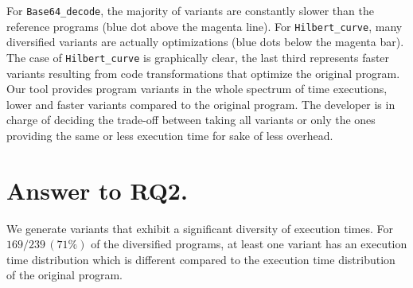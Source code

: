 For \texttt{Base64\_decode}, the majority of variants are constantly slower than the reference programs (blue dot above the magenta line). For \texttt{Hilbert\_curve}, many diversified variants are actually optimizations (blue dots below the magenta bar). The case of \texttt{Hilbert\_curve} is graphically clear, the last third represents faster variants resulting from code transformations that optimize the original program.
Our tool provides program variants in the whole spectrum of time executions, lower and faster variants compared to the original program. The developer is in charge of deciding the trade-off between taking all variants or only the ones providing the same or less execution time for sake of less overhead. 



\section{Answer to RQ2.}

We generate variants that exhibit a significant diversity of execution times. For $169/239\,(71\%)$ of the diversified programs, at least one variant has an execution time distribution which is different compared to the execution time distribution of the original program. 


